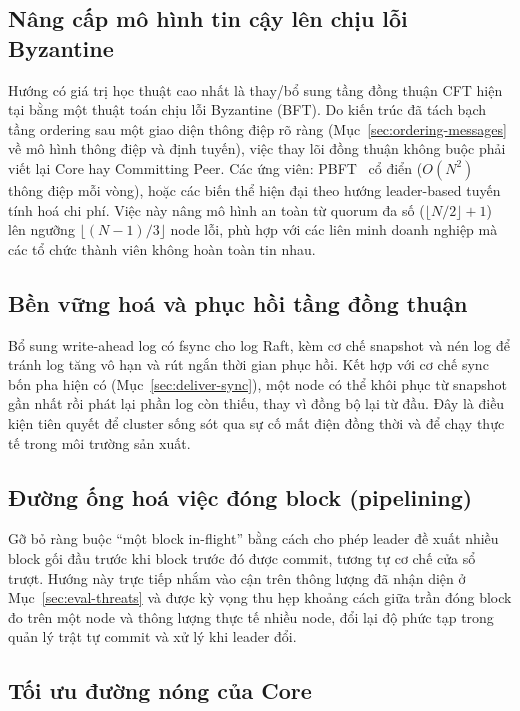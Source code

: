 \subsection{Nâng cấp mô hình tin cậy lên chịu lỗi Byzantine}
\label{sec:fw-bft}

Hướng có giá trị học thuật cao nhất là thay/bổ sung tầng đồng thuận CFT hiện tại
bằng một thuật toán chịu lỗi Byzantine (BFT). Do kiến trúc đã tách bạch
tầng ordering sau một giao diện thông điệp rõ ràng
(Mục~\ref{sec:ordering-messages} về mô hình thông điệp và định tuyến), việc thay
lõi đồng thuận không buộc phải viết lại Core hay Committing Peer. Các ứng viên:
PBFT~\cite{castro1999pbft} cổ điển ($O(N^2)$ thông điệp mỗi vòng), hoặc các biến
thể hiện đại theo hướng leader-based tuyến tính hoá chi phí. Việc này nâng mô
hình an toàn từ quorum đa số ($\lfloor N/2\rfloor + 1$) lên ngưỡng
$\lfloor (N-1)/3\rfloor$ node lỗi, phù hợp với các liên minh doanh nghiệp mà các
tổ chức thành viên không hoàn toàn tin nhau.

\subsection{Bền vững hoá và phục hồi tầng đồng thuận}
\label{sec:fw-durability}

Bổ sung write-ahead log có fsync cho log Raft, kèm cơ chế
snapshot và nén log để tránh log tăng vô hạn và rút ngắn thời gian phục
hồi. Kết hợp với cơ chế sync bốn pha hiện có (Mục~\ref{sec:deliver-sync}), một
node có thể khôi phục từ snapshot gần nhất rồi phát lại phần log còn thiếu, thay
vì đồng bộ lại từ đầu. Đây là điều kiện tiên quyết để cluster sống sót qua sự cố
mất điện đồng thời và để chạy thực tế trong môi trường sản xuất.

\subsection{Đường ống hoá việc đóng block (pipelining)}
\label{sec:fw-pipelining}

Gỡ bỏ ràng buộc ``một block in-flight'' bằng cách cho phép leader đề xuất
nhiều block gối đầu trước khi block trước đó được commit, tương tự cơ
chế cửa sổ trượt. Hướng này trực tiếp nhắm vào cận trên thông lượng đã nhận diện
ở Mục~\ref{sec:eval-threats} và được kỳ vọng thu hẹp khoảng cách giữa trần đóng
block đo trên một node và thông lượng thực tế nhiều node, đổi lại độ phức tạp
trong quản lý trật tự commit và xử lý khi leader đổi.

\subsection{Tối ưu đường nóng của Core}
\label{sec:fw-core}


